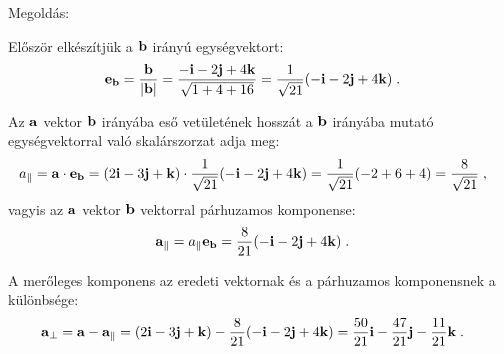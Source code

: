 
\ifdefined\megoldas

Megoldás: 

 Először elkészítjük a $\mathbf{b}$ irányú egységvektort: 
 \begin{align}
  \mathbf{e}_{\mathbf{b}}
   &=\frac{\mathbf{b}}{\left\lvert\mathbf{b}\right\rvert}
    =\frac{-\mathbf{i}-2\mathbf{j}+4\mathbf{k}}{\sqrt{1+4+16}}
    =\frac{1}{\sqrt{21}}(-\mathbf{i}-2\mathbf{j}+4\mathbf{k})\;.
 \end{align}

 Az $\mathbf{a}$ vektor $\mathbf{b}$ irányába eső vetületének hosszát a $\mathbf{b}$ irányába mutató egységvektorral való skalárszorzat adja meg:
 \begin{align}
  a_\parallel 
   &=\mathbf{a}\cdot\mathbf{e}_{\mathbf{b}}
    =(2\mathbf{i}-3\mathbf{j}+\mathbf{k})\cdot \frac{1}{\sqrt{21}}(-\mathbf{i}-2\mathbf{j}+4\mathbf{k})
    =\frac{1}{\sqrt{21}}(-2+6+4)
    =\frac{8}{\sqrt{21}}\;,
 \end{align}
 vagyis az $\mathbf{a}$ vektor $\mathbf{b}$ vektorral párhuzamos komponense:
 \begin{align}
  \mathbf{a}_\parallel
   &=a_\parallel \mathbf{e}_{\mathbf{b}}
    =\frac{8}{21}(-\mathbf{i}-2\mathbf{j}+4\mathbf{k})\;.
 \end{align}

 A merőleges komponens az eredeti vektornak és a párhuzamos komponensnek a különbsége:
 \begin{align}
  \mathbf{a}_\perp
   &=\mathbf{a}-\mathbf{a}_\parallel
    = (2\mathbf{i}-3\mathbf{j}+\mathbf{k}) -\frac{8}{21}(-\mathbf{i}-2\mathbf{j}+4\mathbf{k})
    =\frac{50}{21}\mathbf{i}-\frac{47}{21}\mathbf{j}-\frac{11}{21}\mathbf{k}\;.
 \end{align}

\fi